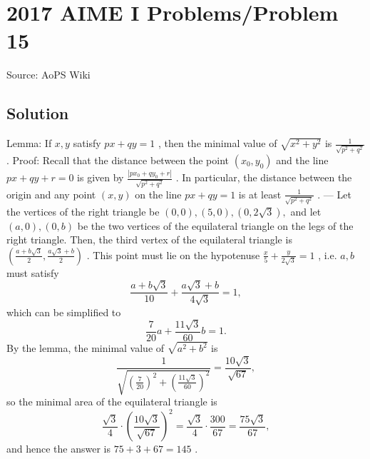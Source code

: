 \documentclass[12pt]{article}
\begin{document}
\section*{{2017 AIME I Problems/Problem 15}}
Source: AoPS Wiki

\subsection*{Solution}
Lemma: If $x,y$ satisfy $px+qy=1$ , then the minimal value of $\sqrt{x^2+y^2}$ is $\frac{1}{\sqrt{p^2+q^2}}$ . Proof: Recall that the distance between the point $(x_0,y_0)$ and the line $px+qy+r = 0$ is given by $\frac{|px_0+qy_0+r|}{\sqrt{p^2+q^2}}$ . In particular, the distance between the origin and any point $(x,y)$ on the line $px+qy=1$ is at least $\frac{1}{\sqrt{p^2+q^2}}$ . --- Let the vertices of the right triangle be $(0,0),(5,0),(0,2\sqrt{3}),$ and let $(a,0),(0,b)$ be the two vertices of the equilateral triangle on the legs of the right triangle. Then, the third vertex of the equilateral triangle is $\left(\frac{a+b\sqrt{3}}{2},\frac{a\sqrt{3}+b}{2}\right)$ . This point must lie on the hypotenuse $\frac{x}{5} + \frac{y}{2\sqrt{3}} = 1$ , i.e. $a,b$ must satisfy \[\frac{a+b\sqrt{3}}{10}+\frac{a\sqrt{3}+b}{4\sqrt{3}} = 1,\] which can be simplified to \[\frac{7}{20}a + \frac{11\sqrt{3}}{60}b = 1.\] By the lemma, the minimal value of $\sqrt{a^2+b^2}$ is \[\frac{1}{\sqrt{\left(\frac{7}{20}\right)^2 + \left(\frac{11\sqrt{3}}{60}\right)^2}} = \frac{10\sqrt{3}}{\sqrt{67}},\] so the minimal area of the equilateral triangle is \[\frac{\sqrt{3}}{4} \cdot \left(\frac{10\sqrt{3}}{\sqrt{67}}\right)^2 = \frac{\sqrt{3}}{4} \cdot \frac{300}{67} = \frac{75\sqrt{3}}{67},\] and hence the answer is $75+3+67=\boxed{145}$ .
\end{document}
